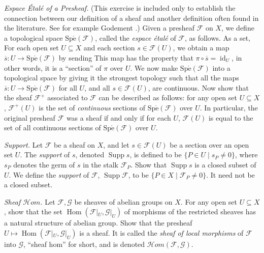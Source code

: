 {\begin{description}[leftmargin=2.4em,labelindent=0pt,topsep=3pt,itemsep=5pt,parsep=0pt]
\item[\hypertarget{ex-II-1.13}{}\textbf{1.13.}] \emph{Espace \'Etal\'e of a Presheaf.} (This exercise is included only to establish the connection between our definition of a sheaf and another definition often found in the literature. See for example Godement .) Given a presheaf $\mathcal F$ on $X$, we define a topological space $\operatorname{Sp\acute e}(\mathcal F)$, called the \emph{espace \'etal\'e} of $\mathcal F$, as follows. As a set, \hypertarget{err-II-1-13}{} For each open set $U\subseteq X$ and each section $s\in\mathcal F(U)$, we obtain a map $\overline s\colon U\to\operatorname{Sp\acute e}(\mathcal F)$ by sending  This map has the property that $\pi\circ\overline s=\operatorname{id}_U$, in other words, it is a \textquotedblleft{}section\textquotedblright{} of $\pi$ over $U$. We now make $\operatorname{Sp\acute e}(\mathcal F)$ into a topological space by giving it the strongest topology such that all the maps $\overline s\colon U\to\operatorname{Sp\acute e}(\mathcal F)$ for all $U$, and all $s\in\mathcal F(U)$, are continuous. Now show that the sheaf $\mathcal F^+$ associated to $\mathcal F$ can be described as follows: for any open set $U\subseteq X$, $\mathcal F^+(U)$ is the set of \emph{continuous} sections of $\operatorname{Sp\acute e}(\mathcal F)$ over $U$. In particular, the original presheaf $\mathcal F$ was a sheaf if and only if for each $U$, $\mathcal F(U)$ is equal to the set of all continuous sections of $\operatorname{Sp\acute e}(\mathcal F)$ over $U$.

\item[\hypertarget{ex-II-1.14}{}\textbf{1.14.}] \emph{Support.} Let $\mathcal F$ be a sheaf on $X$, and let $s\in\mathcal F(U)$ be a section over an open set $U$. The \emph{support} of $s$, denoted $\operatorname{Supp}s$, is defined to be $\{P\in U\mid s_P\ne0\}$, where $s_P$ denotes the germ of $s$ in the stalk $\mathcal F_P$. Show that $\operatorname{Supp}s$ is a closed subset of $U$. We define the \emph{support} of $\mathcal F$, $\operatorname{Supp}\mathcal F$, to be $\{P\in X\mid\mathcal F_P\ne0\}$. It need not be a closed subset.

\item[\hypertarget{ex-II-1.15}{}\textbf{1.15.}] \emph{Sheaf $\mathcal H\!om$.} Let $\mathcal F,\mathcal G$ be sheaves of abelian groups on $X$. For any open set $U\subseteq X$, show that the set $\operatorname{Hom}(\mathcal F|_U,\mathcal G|_U)$ of morphisms of the restricted sheaves has a natural structure of abelian group. Show that the presheaf $U\mapsto\operatorname{Hom}(\mathcal F|_U,\mathcal G|_U)$ is a sheaf. It is called the \emph{sheaf of local morphisms} of $\mathcal F$ into $\mathcal G$, \textquotedblleft{}sheaf hom\textquotedblright{} for short, and is denoted $\mathcal H\!om(\mathcal F,\mathcal G)$.


\end{description}}
